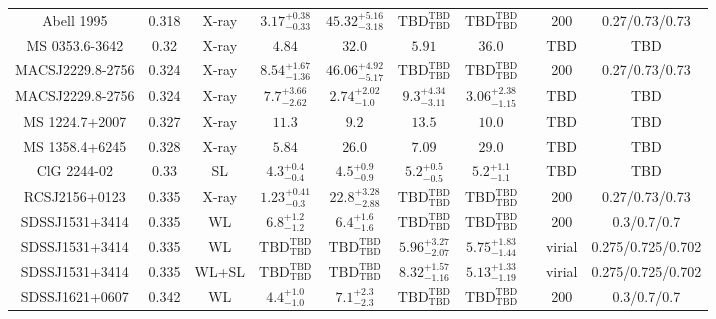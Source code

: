 \begin{table}
\begin{tabular}{cccccccccc}
Abell 1995 & 0.318 & X-ray & ${3.17}^{+0.38}_{-0.33}$ & ${45.32}^{+5.16}_{-3.18}$ & ${\mathrm{TBD}}^{\mathrm{TBD}}_{\mathrm{TBD}}$ & ${\mathrm{TBD}}^{\mathrm{TBD}}_{\mathrm{TBD}}$ & \citet{BA14.1} & 200 & 0.27/0.73/0.73 \\
MS 0353.6-3642 & 0.32 & X-ray & ${4.84}^{}_{}$ & ${32.0}^{}_{}$ & ${5.91}^{}_{}$ & ${36.0}^{}_{}$ & \citet{MO99.1} & TBD & TBD \\
MACSJ2229.8-2756 & 0.324 & X-ray & ${8.54}^{+1.67}_{-1.36}$ & ${46.06}^{+4.92}_{-5.17}$ & ${\mathrm{TBD}}^{\mathrm{TBD}}_{\mathrm{TBD}}$ & ${\mathrm{TBD}}^{\mathrm{TBD}}_{\mathrm{TBD}}$ & \citet{BA14.1} & 200 & 0.27/0.73/0.73 \\
MACSJ2229.8-2756 & 0.324 & X-ray & ${7.7}^{+3.66}_{-2.62}$ & ${2.74}^{+2.02}_{-1.0}$ & ${9.3}^{+4.34}_{-3.11}$ & ${3.06}^{+2.38}_{-1.15}$ & \citet{SC06.1} & TBD & TBD \\
MS 1224.7+2007 & 0.327 & X-ray & ${11.3}^{}_{}$ & ${9.2}^{}_{}$ & ${13.5}^{}_{}$ & ${10.0}^{}_{}$ & \citet{MO99.1} & TBD & TBD \\
MS 1358.4+6245 & 0.328 & X-ray & ${5.84}^{}_{}$ & ${26.0}^{}_{}$ & ${7.09}^{}_{}$ & ${29.0}^{}_{}$ & \citet{MO99.1} & TBD & TBD \\
ClG 2244-02 & 0.33 & SL & ${4.3}^{+0.4}_{-0.4}$ & ${4.5}^{+0.9}_{-0.9}$ & ${5.2}^{+0.5}_{-0.5}$ & ${5.2}^{+1.1}_{-1.1}$ & \citet{CO07.1} & TBD & TBD \\
RCSJ2156+0123 & 0.335 & X-ray & ${1.23}^{+0.41}_{-0.3}$ & ${22.8}^{+3.28}_{-2.88}$ & ${\mathrm{TBD}}^{\mathrm{TBD}}_{\mathrm{TBD}}$ & ${\mathrm{TBD}}^{\mathrm{TBD}}_{\mathrm{TBD}}$ & \citet{BA14.1} & 200 & 0.27/0.73/0.73 \\
SDSSJ1531+3414 & 0.335 & WL & ${6.8}^{+1.2}_{-1.2}$ & ${6.4}^{+1.6}_{-1.6}$ & ${\mathrm{TBD}}^{\mathrm{TBD}}_{\mathrm{TBD}}$ & ${\mathrm{TBD}}^{\mathrm{TBD}}_{\mathrm{TBD}}$ & \citet{SE14.1} & 200 & 0.3/0.7/0.7 \\
SDSSJ1531+3414 & 0.335 & WL & ${\mathrm{TBD}}^{\mathrm{TBD}}_{\mathrm{TBD}}$ & ${\mathrm{TBD}}^{\mathrm{TBD}}_{\mathrm{TBD}}$ & ${5.96}^{+3.27}_{-2.07}$ & ${5.75}^{+1.83}_{-1.44}$ & \citet{OG12.1} & virial & 0.275/0.725/0.702 \\
SDSSJ1531+3414 & 0.335 & WL+SL & ${\mathrm{TBD}}^{\mathrm{TBD}}_{\mathrm{TBD}}$ & ${\mathrm{TBD}}^{\mathrm{TBD}}_{\mathrm{TBD}}$ & ${8.32}^{+1.57}_{-1.16}$ & ${5.13}^{+1.33}_{-1.19}$ & \citet{OG12.1} & virial & 0.275/0.725/0.702 \\
SDSSJ1621+0607 & 0.342 & WL & ${4.4}^{+1.0}_{-1.0}$ & ${7.1}^{+2.3}_{-2.3}$ & ${\mathrm{TBD}}^{\mathrm{TBD}}_{\mathrm{TBD}}$ & ${\mathrm{TBD}}^{\mathrm{TBD}}_{\mathrm{TBD}}$ & \citet{SE14.1} & 200 & 0.3/0.7/0.7 \\

\end{tabular}
\end{table}
